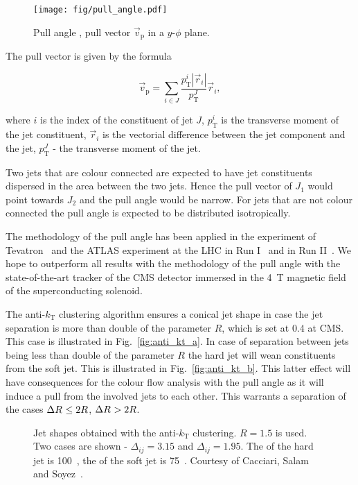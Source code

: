 \begin{figure}[hbtp]
  \centering
  \texttt{[image: fig/pull\_angle.pdf]}
  \caption{Pull angle \pullangle, pull vector $\vec{v}_{\text{p}}$ in a $y$-$\phi$ plane.}
  \label{fig:pull_angle}
\end{figure}

The pull vector is given by the formula

\begin{equation}
  \vec{v}_{\text{p}}=\sum_{i\in J}\frac{p^{i}_{\text{T}}|\vec{r}_{i}|}{p^{J}_{\text{T}}}\vec{r}_{i},
  \label{Eq:pull_angle}
\end{equation}

\noindent where $i$ is the index of the constituent of jet $J$, $p^{i}_{\text{T}}$ is the transverse moment of the jet constituent, $\vec{r}_{i}$ is the vectorial difference between the jet component and the jet, $p^{J}_{\text{T}}$ - the transverse moment of the jet.

Two jets that are colour connected are expected to have jet constituents dispersed in the area between the two jets. Hence the pull vector of $J_{1}$ would point towards $J_{2}$ and the pull angle would be narrow. For jets that are not colour connected the pull angle is expected to be distributed isotropically.

The methodology of the pull angle has been applied in the \DZERO experiment of Tevatron~\cite{Abazov:2011vh} and the ATLAS experiment at the LHC in Run I~\cite{Aad:2015lxa} and in Run II~\cite{ATLAS:2017iaz}. We hope to outperform all results with the methodology of the pull angle with the state-of-the-art tracker of the CMS detector immersed in the 4~T magnetic field of the superconducting solenoid.

The anti-$k_{\text{T}}$ clustering algorithm ensures a conical jet shape in case the jet separation \DeltaR is more than double of the parameter $R$, which is set at 0.4 at CMS. This case is illustrated in Fig.~\ref{fig:anti_kt_a}. In case of separation between jets \DeltaR being less than double of the parameter $R$ the hard jet will wean constituents from the soft jet. This is illustrated in Fig.~\ref{fig:anti_kt_b}. This latter effect will have consequences for the colour flow analysis with the pull angle as it will induce a pull from the involved jets to each other. This warrants a separation of the cases $\Delta R^{}\leq2R$, $\Delta R^{}>2R$. 

\begin{figure}[hbtp]
  \def\twidth{0.5}
   \caption{Jet shapes obtained with the anti-$k_{\text{T}}$ clustering. $R=1.5$ is used. Two cases are shown - $\Delta_{ij}=3.15$ and  $\Delta_{ij}=1.95$. The \pt of the hard jet is 100~\GeV, the \pt of the soft jet is 75~\GeV. Courtesy of Cacciari, Salam and Soyez~\cite{github:antikt}.}
  \label{fig:anti_kt}
\end{figure}

